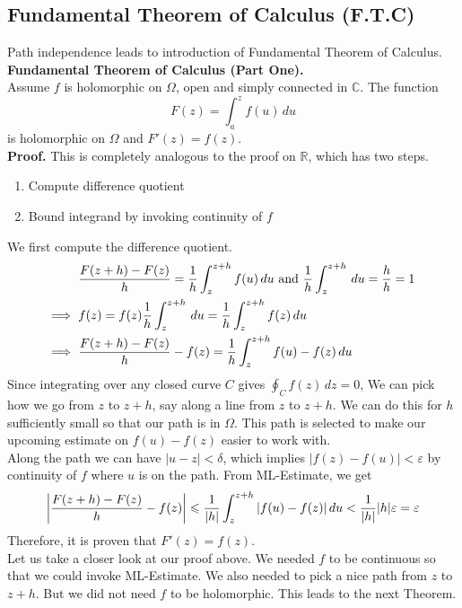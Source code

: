 \documentclass[11pt]{article}
\newcommand*\circled[1]{\tikz[baseline=(char.base)]{
            \node[shape=circle,draw,inner sep=2pt] (char) {#1};}}
\DeclarePairedDelimiter\abs{\lvert}{\rvert}
\begin{document}
\subsection{Fundamental Theorem of Calculus (F.T.C)} 
Path independence leads to introduction of Fundamental Theorem of Calculus. \\
\newline
\textbf{Fundamental Theorem of Calculus (Part One).} \\
Assume $f$ is holomorphic on $\Omega$, open and simply connected in $\mathbb{C}$. The function 
$$F(z) = \int_a^z f(u) \,du$$
is holomorphic on $\Omega$ and $F'(z) = f(z)$. \\
\textbf{Proof.} This is completely analogous to the proof on $\mathbb{R}$, which has two steps.
\begin{enumerate}[leftmargin=*, nolistsep]
\item Compute difference quotient 
\item Bound integrand by invoking continuity of $f$ 
\end{enumerate}
\circled{\scriptsize1} We first compute the difference quotient. 
\begin{align*}
&\frac{F(z+h) - F(z)}{h} = \frac{1}{h}\int_z^{z+h} f(u) \,du \text{ and } \frac{1}{h}\int_z^{z+h}\,du = \frac{h}{h} = 1 \\
\Longrightarrow \hspace{2mm} &f(z) = f(z)\frac{1}{h}\int_z^{z+h}\,du = \frac{1}{h}\int_z^{z+h}f(z) \,du \\
\Longrightarrow \hspace{2mm} &\frac{F(z+h) - F(z)}{h} - f(z) = \frac{1}{h}\int_z^{z+h}f(u) - f(z) \,du
\end{align*}
\circled{\scriptsize2} Since integrating over any closed curve $C$ gives $\oint_C f(z) \,dz = 0$, 
We can pick how we go from $z$ to $z +h$, say along a line from $z$ to $z + h$. We can do this for $h$ sufficiently small so that our path is in $\Omega$. This path is selected to make our upcoming estimate on $f(u) - f(z)$ easier to work with. \\
Along the path we can have $|u - z| < \delta$, which implies $|f(z) - f(u)| < \varepsilon$ by continuity of $f$ where $u$ is on the path. From ML-Estimate, we get 
$$\abs*{\frac{F(z+h) - F(z)}{h} - f(z)} \leqslant \frac{1}{|h|}\int_z^{z+h}|f(u) - f(z)|\,du < \frac{1}{|h|}|h|\varepsilon = \varepsilon$$
Therefore, it is proven that $F'(z) = f(z)$. \\
\newline
Let us take a closer look at our proof above. We needed $f$ to be continuous so that we could invoke ML-Estimate. We also needed to pick a nice path from $z$ to $z + h$. But we did not need $f$ to be holomorphic. This leads to the next Theorem. \\
\end{document}
